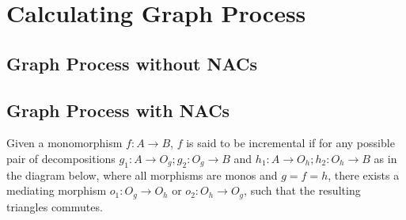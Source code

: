 \begin{definition}
\end{definition}

\section{Calculating Graph Process}

\subsection{Graph Process without NACs}

\begin{definition}
\end{definition}

\subsection{Graph Process with NACs}

\begin{definition} Given a monomorphism \mbox{$f : A \rightarrow B$}, $f$ is said to be incremental if for any possible pair of decompositions \mbox{$g_1 : A \rightarrow O_g;g_2 : O_g \rightarrow B$} and \mbox{$h_1 : A \rightarrow O_h;h_2 : O_h \rightarrow B$} as in the diagram below, where all morphisms are monos and $g = f = h$, there exists a mediating morphism $o_1 : O_g \rightarrow O_h$ or $o_2 : O_h \rightarrow O_g$, such that the resulting triangles commutes.



\end{definition}

\begin{definition}
\end{definition}
